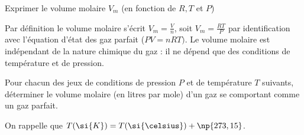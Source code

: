 \debutEntrainement


\begin{enonce}
Exprimer le volume molaire $V_m$ (en fonction de $R, T$ et $P$) 
\end{enonce}


\begin{corrige}
Par définition le volume molaire s'écrit $V_m=\frac{V}{n}$, soit $V_m= \frac{RT}{P}$ par identification avec l'équation d'état des gaz parfait ($PV=nRT)$. Le volume molaire est indépendant de la nature chimique du gaz : il ne dépend que des conditions de température et de pression.
\end{corrige}


\finEntrainement




\hauteurLargeurCadreReponse		{6mm}{4cm}
\initialisationEntrainement

Pour chacun des jeux de conditions de pression $P$ et de température $T$ suivants, déterminer le volume molaire (en litres par mole) d'un gaz se comportant comme un gaz parfait.

On rappelle que $T(\si{K}) = T(\si{\celsius}) + \np{273,15}$.


